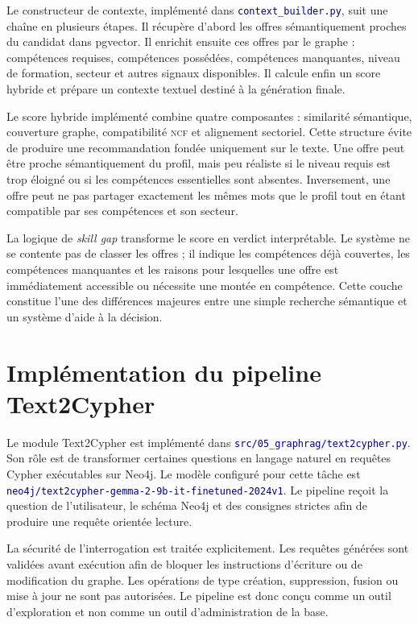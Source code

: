 \documentclass[12pt,twoside]{report}
\newcommand{\filevar}[1]{\texttt{\textcolor{darkblue}{#1}}}
\newcommand{\NCF}{\textsc{ncf}}
\begin{document}
Le constructeur de contexte, implémenté dans \filevar{context\_builder.py}, suit une chaîne en plusieurs étapes. Il récupère d'abord les offres sémantiquement proches du candidat dans pgvector. Il enrichit ensuite ces offres par le graphe : compétences requises, compétences possédées, compétences manquantes, niveau de formation, secteur et autres signaux disponibles. Il calcule enfin un score hybride et prépare un contexte textuel destiné à la génération finale.

Le score hybride implémenté combine quatre composantes : similarité sémantique, couverture graphe, compatibilité \NCF{} et alignement sectoriel. Cette structure évite de produire une recommandation fondée uniquement sur le texte. Une offre peut être proche sémantiquement du profil, mais peu réaliste si le niveau requis est trop éloigné ou si les compétences essentielles sont absentes. Inversement, une offre peut ne pas partager exactement les mêmes mots que le profil tout en étant compatible par ses compétences et son secteur.

La logique de \textit{skill gap} transforme le score en verdict interprétable. Le système ne se contente pas de classer les offres ; il indique les compétences déjà couvertes, les compétences manquantes et les raisons pour lesquelles une offre est immédiatement accessible ou nécessite une montée en compétence. Cette couche constitue l'une des différences majeures entre une simple recherche sémantique et un système d'aide à la décision.

\section{Implémentation du pipeline Text2Cypher}

Le module Text2Cypher est implémenté dans \filevar{src/05\_graphrag/text2cypher.py}. Son rôle est de transformer certaines questions en langage naturel en requêtes Cypher exécutables sur Neo4j. Le modèle configuré pour cette tâche est \filevar{neo4j/text2cypher-gemma-2-9b-it-finetuned-2024v1}. Le pipeline reçoit la question de l'utilisateur, le schéma Neo4j et des consignes strictes afin de produire une requête orientée lecture.

La sécurité de l'interrogation est traitée explicitement. Les requêtes générées sont validées avant exécution afin de bloquer les instructions d'écriture ou de modification du graphe. Les opérations de type création, suppression, fusion ou mise à jour ne sont pas autorisées. Le pipeline est donc conçu comme un outil d'exploration et non comme un outil d'administration de la base.
\end{document}
